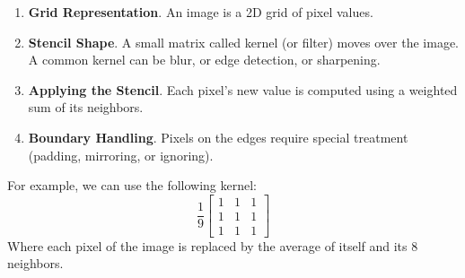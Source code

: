 \begin{examplebox}
    \begin{enumerate}
        \item \textbf{Grid Representation}. An image is a 2D grid of pixel values.
        \item \textbf{Stencil Shape}. A small matrix called kernel (or filter) moves over the image. A common kernel can be blur, or edge detection, or sharpening.
        \item \textbf{Applying the Stencil}. Each pixel's new value is computed using a weighted sum of its neighbors.
        \item \textbf{Boundary Handling}. Pixels on the edges require special treatment (padding, mirroring, or ignoring).
    \end{enumerate}
    For example, we can use the following kernel:
    \begin{equation*}
        \dfrac{1}{9} \begin{bmatrix}
            1 & 1 & 1 \\ 
            1 & 1 & 1 \\ 
            1 & 1 & 1 
        \end{bmatrix}
    \end{equation*}
    Where each pixel of the image is replaced by the average of itself and its 8 neighbors.
\end{examplebox}
